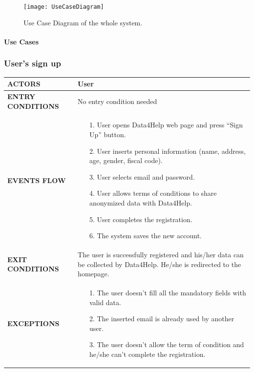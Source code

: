 \documentclass[a4paper]{article}
\begin{document}
\begin{figure}
    \centering
    \texttt{[image: UseCaseDiagram]}
    \caption{Use Case Diagram of the whole system.}
    \label{fig:my_label}
\end{figure}

\clearpage

\paragraph{Use Cases}
\subsubsection{User's sign up}

\begin{center}
\begin{tabular}{|l || p{8cm} ||}
    \hline\bf{ACTORS} & User \\ 
    \hline
    \bf{ENTRY CONDITIONS} & No entry condition needed  \\ 
    \hline
    \bf{EVENTS FLOW} & \begin{itemize}[noitemsep, topsep=0cm, leftmargin=*] \vspace{-0.2cm}
        \item[1.] User opens Data4Help web page and press “Sign Up” button.
        \item[2.] User inserts personal information (name, address, age, gender, fiscal code).
        \item[3.] User selects email and password.
        \item[4.] User allows terms of conditions to share anonymized data with Data4Help.
        \item[5.] User completes the registration.
        \item[6.] The system saves the new account.
    \end{itemize}\\ 
    \hline
    \bf{EXIT CONDITIONS} & The user is successfully registered and his/her data can be collected by Data4Help. He/she is redirected to the homepage. \\ \hline
    \bf{EXCEPTIONS} & \begin{itemize}[noitemsep, topsep=0cm, leftmargin=*] \vspace{-0.2cm}
        \item[1.] The user doesn’t fill all the mandatory fields with valid data.
        \item[2.]The inserted email is already used by another user.
        \item[3.] The user doesn’t allow the term of condition and he/she can’t complete the registration.
    \end{itemize}
    \\ \hline \hline
\end{tabular}
\end{center}
\end{document}
